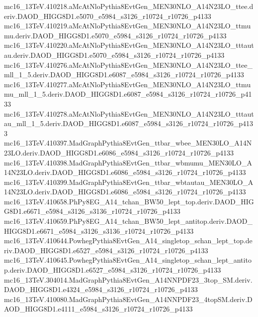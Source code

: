 \begin{scriptsize}
mc16\_13TeV.410218.aMcAtNloPythia8EvtGen\_MEN30NLO\_A14N23LO\_ttee.deriv.DAOD\_HIGG8D1.e5070\_e5984\_s3126\_r10724\_r10726\_p4133 \\
mc16\_13TeV.410219.aMcAtNloPythia8EvtGen\_MEN30NLO\_A14N23LO\_ttmumu.deriv.DAOD\_HIGG8D1.e5070\_e5984\_s3126\_r10724\_r10726\_p4133 \\
mc16\_13TeV.410220.aMcAtNloPythia8EvtGen\_MEN30NLO\_A14N23LO\_tttautau.deriv.DAOD\_HIGG8D1.e5070\_e5984\_s3126\_r10724\_r10726\_p4133 \\
mc16\_13TeV.410276.aMcAtNloPythia8EvtGen\_MEN30NLO\_A14N23LO\_ttee\_mll\_1\_5.deriv.DAOD\_HIGG8D1.e6087\_e5984\_s3126\_r10724\_r10726\_p4133 \\
mc16\_13TeV.410277.aMcAtNloPythia8EvtGen\_MEN30NLO\_A14N23LO\_ttmumu\_mll\_1\_5.deriv.DAOD\_HIGG8D1.e6087\_e5984\_s3126\_r10724\_r10726\_p4133 \\
mc16\_13TeV.410278.aMcAtNloPythia8EvtGen\_MEN30NLO\_A14N23LO\_tttautau\_mll\_1\_5.deriv.DAOD\_HIGG8D1.e6087\_e5984\_s3126\_r10724\_r10726\_p4133 \\
mc16\_13TeV.410397.MadGraphPythia8EvtGen\_ttbar\_wbee\_MEN30LO\_A14N23LO.deriv.DAOD\_HIGG8D1.e6086\_e5984\_s3126\_r10724\_r10726\_p4133 \\
mc16\_13TeV.410398.MadGraphPythia8EvtGen\_ttbar\_wbmumu\_MEN30LO\_A14N23LO.deriv.DAOD\_HIGG8D1.e6086\_e5984\_s3126\_r10724\_r10726\_p4133 \\
mc16\_13TeV.410399.MadGraphPythia8EvtGen\_ttbar\_wbtautau\_MEN30LO\_A14N23LO.deriv.DAOD\_HIGG8D1.e6086\_e5984\_s3126\_r10724\_r10726\_p4133 \\
mc16\_13TeV.410658.PhPy8EG\_A14\_tchan\_BW50\_lept\_top.deriv.DAOD\_HIGG8D1.e6671\_e5984\_s3126\_s3136\_r10724\_r10726\_p4133 \\
mc16\_13TeV.410659.PhPy8EG\_A14\_tchan\_BW50\_lept\_antitop.deriv.DAOD\_HIGG8D1.e6671\_e5984\_s3126\_s3136\_r10724\_r10726\_p4133 \\
mc16\_13TeV.410644.PowhegPythia8EvtGen\_A14\_singletop\_schan\_lept\_top.deriv.DAOD\_HIGG8D1.e6527\_e5984\_s3126\_r10724\_r10726\_p4133 \\
mc16\_13TeV.410645.PowhegPythia8EvtGen\_A14\_singletop\_schan\_lept\_antitop.deriv.DAOD\_HIGG8D1.e6527\_e5984\_s3126\_r10724\_r10726\_p4133 \\
mc16\_13TeV.304014.MadGraphPythia8EvtGen\_A14NNPDF23\_3top\_SM.deriv.DAOD\_HIGG8D1.e4324\_e5984\_s3126\_r10724\_r10726\_p4133 \\
mc16\_13TeV.410080.MadGraphPythia8EvtGen\_A14NNPDF23\_4topSM.deriv.DAOD\_HIGG8D1.e4111\_e5984\_s3126\_r10724\_r10726\_p4133 \\

\end{scriptsize}
